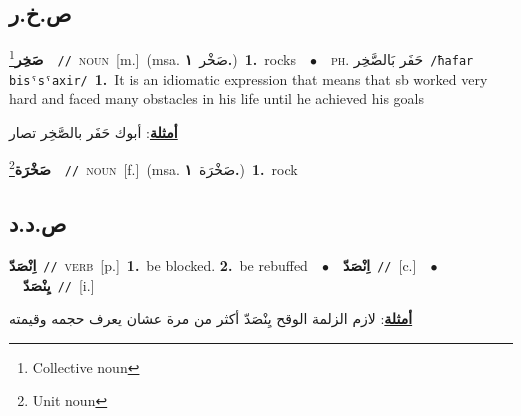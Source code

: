 \documentclass[10pt,a4paper,twoside]{article} %
\begin{document}
\begin{multicols}{2}
\vspace{-3mm}
\subsection*{\color{blue}\foreignlanguage{arabic}{ص.خ.ر}\color{blue}{}} 

{\setlength\topsep{0pt}\textbf{\foreignlanguage{arabic}{صَخِر}}\footnote{Collective noun}\ \ {\color{gray}\texttt{//}\color{black}}\ \textsc{noun}\ [m.]\ \color{gray}(msa. \foreignlanguage{arabic}{صَخْر}~\foreignlanguage{arabic}{\textbf{١.}})\color{black}\ \textbf{1.}~rocks\ \ $\bullet$\ \ \textsc{ph.} \color{gray} \foreignlanguage{arabic}{حَفَر بَالصَّخِر}\color{black}\ {\color{gray}\texttt{/{\sffamily ħafar bisˤsˤaxir}/}\color{black}}\ \textbf{1.}~It is an idiomatic expression that means that sb worked very hard and faced many obstacles in his life until he achieved his goals\  \begin{flushright}\color{gray}\foreignlanguage{arabic}{\textbf{\underline{\foreignlanguage{arabic}{أمثلة}}}: أبوك حَفَر بالصَّخِر تصار}\end{flushright}\color{black}} \vspace{2mm}

{\setlength\topsep{0pt}\textbf{\foreignlanguage{arabic}{صَخْرَة}}\footnote{Unit noun}\ \ {\color{gray}\texttt{//}\color{black}}\ \textsc{noun}\ [f.]\ \color{gray}(msa. \foreignlanguage{arabic}{صَخْرَة}~\foreignlanguage{arabic}{\textbf{١.}})\color{black}\ \textbf{1.}~rock\ } \vspace{2mm}

\vspace{-3mm}
\subsection*{\color{blue}\foreignlanguage{arabic}{ص.د.د}\color{blue}{}} 

{\setlength\topsep{0pt}\textbf{\foreignlanguage{arabic}{اِنْصَدّ}}\ {\color{gray}\texttt{//}\color{black}}\ \textsc{verb}\ [p.]\ \textbf{1.}~be blocked.  \textbf{2.}~be rebuffed\ \ $\bullet$\ \ \setlength\topsep{0pt}\textbf{\foreignlanguage{arabic}{اِنْصَدّ}}\ {\color{gray}\texttt{//}\color{black}}\ [c.]\ \ $\bullet$\ \ \setlength\topsep{0pt}\textbf{\foreignlanguage{arabic}{يِنْصَدّ}}\ {\color{gray}\texttt{//}\color{black}}\ [i.]\  \begin{flushright}\color{gray}\foreignlanguage{arabic}{\textbf{\underline{\foreignlanguage{arabic}{أمثلة}}}: لازم الزلمة الوقح يِنْصَدّ أكثر من مرة عشان يعرف حجمه وقيمته}\end{flushright}\color{black}} \vspace{2mm}


\end{multicols}
\end{document}
